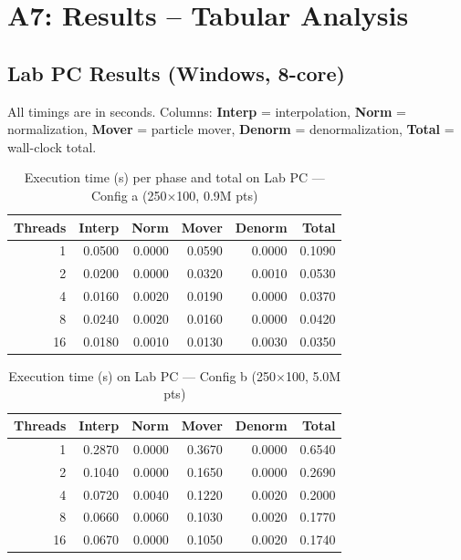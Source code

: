 \documentclass[12pt,a4paper]{article}
\begin{document}
\section{A7: Results -- Tabular Analysis}

\subsection{Lab PC Results (Windows, 8-core)}

All timings are in seconds. Columns: \textbf{Interp} = interpolation, \textbf{Norm} = normalization,
\textbf{Mover} = particle mover, \textbf{Denorm} = denormalization, \textbf{Total} = wall-clock total.

\begin{table}[H]
\centering
\caption{Execution time (s) per phase and total on Lab PC --- Config a (250$\times$100, 0.9M pts)}
\label{tab:lab_a}
\begin{tabular}{rrrrrr}
\toprule
\textbf{Threads} & \textbf{Interp} & \textbf{Norm} & \textbf{Mover} & \textbf{Denorm} & \textbf{Total} \\
\midrule
1  & 0.0500 & 0.0000 & 0.0590 & 0.0000 & 0.1090 \\
2  & 0.0200 & 0.0000 & 0.0320 & 0.0010 & 0.0530 \\
4  & 0.0160 & 0.0020 & 0.0190 & 0.0000 & 0.0370 \\
8  & 0.0240 & 0.0020 & 0.0160 & 0.0000 & 0.0420 \\
16 & 0.0180 & 0.0010 & 0.0130 & 0.0030 & 0.0350 \\
\bottomrule
\end{tabular}
\end{table}

\begin{table}[H]
\centering
\caption{Execution time (s) on Lab PC --- Config b (250$\times$100, 5.0M pts)}
\label{tab:lab_b}
\begin{tabular}{rrrrrr}
\toprule
\textbf{Threads} & \textbf{Interp} & \textbf{Norm} & \textbf{Mover} & \textbf{Denorm} & \textbf{Total} \\
\midrule
1  & 0.2870 & 0.0000 & 0.3670 & 0.0000 & 0.6540 \\
2  & 0.1040 & 0.0000 & 0.1650 & 0.0000 & 0.2690 \\
4  & 0.0720 & 0.0040 & 0.1220 & 0.0020 & 0.2000 \\
8  & 0.0660 & 0.0060 & 0.1030 & 0.0020 & 0.1770 \\
16 & 0.0670 & 0.0000 & 0.1050 & 0.0020 & 0.1740 \\
\bottomrule
\end{tabular}
\end{table}
\end{document}
